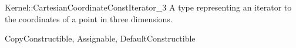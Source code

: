\begin{ccRefConcept}{Kernel::CartesianCoordinateConstIterator_3}
A type representing an iterator to the  coordinates of a point
in three dimensions.

\ccRefines
CopyConstructible, Assignable, DefaultConstructible

\ccSeeAlso
{} \\

\end{ccRefConcept}
